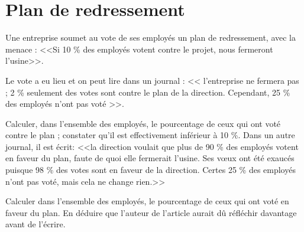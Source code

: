 \section{Plan de redressement}

Une entreprise soumet au vote de ses employés un plan de redressement, avec la menace : <<Si 10 \% des employés votent contre le projet, nous fermeront l'usine>>.

Le vote a eu lieu et on peut lire dans un journal : << l'entreprise ne fermera pas ; 2 \% seulement des votes sont contre le plan de la direction. Cependant, 25 \% des employés n'ont pas voté >>.

\begin{questions}
	\question Calculer, dans l'ensemble des employés, le pourcentage de ceux qui ont voté contre le plan ; constater qu'il est effectivement inférieur à 10 \%.
	\question Dans un autre journal, il est écrit: <<la direction voulait que plus de 90 \% des employés votent en faveur du plan, faute de quoi elle fermerait l'usine. Ses v\oe ux ont été exaucés puisque 98 \% des votes sont en faveur de la direction. Certes 25 \% des employés n'ont pas voté, mais cela ne change rien.>>
	
	Calculer dans l'ensemble des employés, le pourcentage de ceux qui ont voté en faveur du plan. En déduire que l'auteur de l'article aurait dû réfléchir davantage avant de l'écrire.  
\end{questions} 